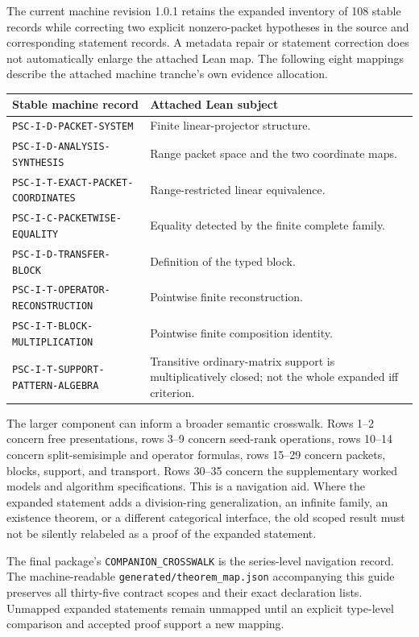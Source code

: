 \documentclass[11pt,a4paper]{article}
\newcommand{\code}[1]{\nolinkurl{#1}}
\begin{document}
The current machine revision 1.0.1 retains the expanded inventory of 108 stable records while correcting two explicit nonzero-packet hypotheses in the source and corresponding statement records. A metadata repair or statement correction does not automatically enlarge the attached Lean map. The following eight mappings describe the attached machine tranche's own evidence allocation.

\begin{longtable}{p{}p{}}
\toprule Stable machine record & Attached Lean subject \\\midrule\endhead
\code{PSC-I-D-PACKET-SYSTEM} & Finite linear-projector structure. \\
\code{PSC-I-D-ANALYSIS-SYNTHESIS} & Range packet space and the two coordinate maps. \\
\code{PSC-I-T-EXACT-PACKET-COORDINATES} & Range-restricted linear equivalence. \\
\code{PSC-I-C-PACKETWISE-EQUALITY} & Equality detected by the finite complete family. \\
\code{PSC-I-D-TRANSFER-BLOCK} & Definition of the typed block. \\
\code{PSC-I-T-OPERATOR-RECONSTRUCTION} & Pointwise finite reconstruction. \\
\code{PSC-I-T-BLOCK-MULTIPLICATION} & Pointwise finite composition identity. \\
\code{PSC-I-T-SUPPORT-PATTERN-ALGEBRA} & Transitive ordinary-matrix support is multiplicatively closed; not the whole expanded iff criterion. \\
\bottomrule
\end{longtable}

The larger component can inform a broader semantic crosswalk. Rows 1--2 concern free presentations, rows 3--9 concern seed-rank operations, rows 10--14 concern split-semisimple and operator formulas, rows 15--29 concern packets, blocks, support, and transport. Rows 30--35 concern the supplementary worked models and algorithm specifications. This is a navigation aid. Where the expanded statement adds a division-ring generalization, an infinite family, an existence theorem, or a different categorical interface, the old scoped result must not be silently relabeled as a proof of the expanded statement.

The final package's \code{COMPANION_CROSSWALK} is the series-level navigation record. The machine-readable \code{generated/theorem_map.json} accompanying this guide preserves all thirty-five contract scopes and their exact declaration lists. Unmapped expanded statements remain unmapped until an explicit type-level comparison and accepted proof support a new mapping.
\end{document}
